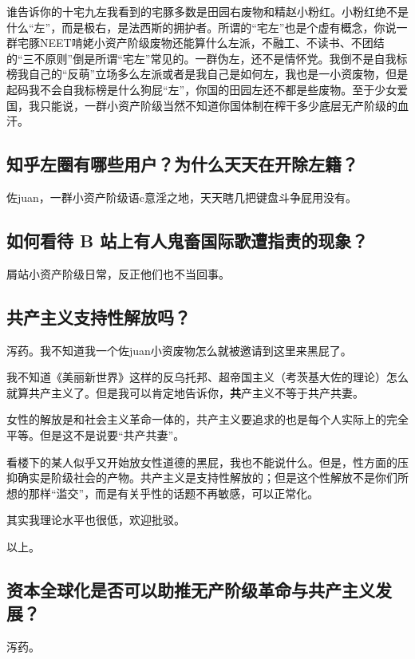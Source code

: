 \documentclass{ctexart}
\begin{document}
	谁告诉你的十宅九左我看到的宅豚多数是田园右废物和精赵小粉红。小粉红绝不是什么“左”，而是极右，是法西斯的拥护者。所谓的“宅左”也是个虚有概念，你说一群宅豚NEET啃姥小资产阶级废物还能算什么左派，不融工、不读书、不团结的“三不原则”倒是所谓“宅左”常见的。一群伪左，还不是情怀党。我倒不是自我标榜我自己的“反萌”立场多么左派或者是我自己是如何左，我也是一小资废物，但是起码我不会自我标榜是什么狗屁“左”，你国的田园左还不都是些废物。至于少女爱国，我只能说，一群小资产阶级当然不知道你国体制在榨干多少底层无产阶级的血汗。
	
	\subsection{知乎左圈有哪些用户？为什么天天在开除左籍？}
	
	佐juan，一群小资产阶级语c意淫之地，天天瞎几把键盘斗争屁用没有。
	
	\subsection{如何看待 B 站上有人鬼畜国际歌遭指责的现象？}
	
	屑站小资产阶级日常，反正他们也不当回事。
	
	\subsection{共产主义支持性解放吗？}
	
	泻药。我不知道我一个佐juan小资废物怎么就被邀请到这里来黑屁了。
	
	我不知道《美丽新世界》这样的反乌托邦、超帝国主义（考茨基大佐的理论）怎么就算共产主义了。但是我可以肯定地告诉你，{\textbf 共产主义不等于共产共妻。}
	
	女性的解放是和社会主义革命一体的，共产主义要追求的也是每个人实际上的完全平等。但是这不是说要“共产共妻”。
	
	看楼下的某人似乎又开始放女性道德的黑屁，我也不能说什么。但是，性方面的压抑确实是阶级社会的产物。共产主义是支持性解放的；但是这个性解放不是你们所想的那样“滥交”，而是有关乎性的话题不再敏感，可以正常化。
	
	其实我理论水平也很低，欢迎批驳。
	
	以上。
	
	\subsection{资本全球化是否可以助推无产阶级革命与共产主义发展？}
	
	泻药。
	
\end{document}
